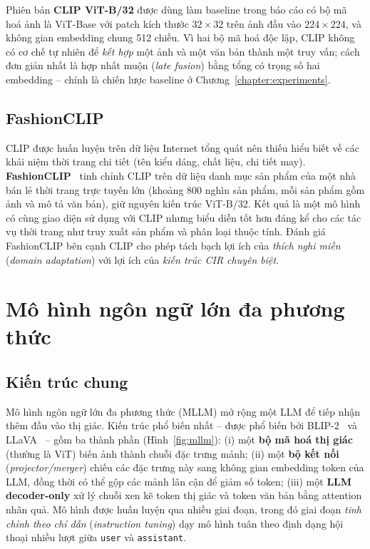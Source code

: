 Phiên bản \textbf{CLIP ViT-B/32} được dùng làm baseline trong báo cáo có bộ mã hoá ảnh là ViT-Base với patch kích thước $32 \times 32$ trên ảnh đầu vào $224 \times 224$, và không gian embedding chung 512 chiều. Vì hai bộ mã hoá độc lập, CLIP không có cơ chế tự nhiên để \emph{kết hợp} một ảnh và một văn bản thành một truy vấn; cách đơn giản nhất là hợp nhất muộn (\emph{late fusion}) bằng tổng có trọng số hai embedding -- chính là chiến lược baseline ở Chương~\ref{chapter:experiments}.

\subsection{FashionCLIP}

CLIP được huấn luyện trên dữ liệu Internet tổng quát nên thiếu hiểu biết về các khái niệm thời trang chi tiết (tên kiểu dáng, chất liệu, chi tiết may). \textbf{FashionCLIP}~\cite{chia2022fashionclip} tinh chỉnh CLIP trên dữ liệu danh mục sản phẩm của một nhà bán lẻ thời trang trực tuyến lớn (khoảng 800 nghìn sản phẩm, mỗi sản phẩm gồm ảnh và mô tả văn bản), giữ nguyên kiến trúc ViT-B/32. Kết quả là một mô hình có cùng giao diện sử dụng với CLIP nhưng biểu diễn tốt hơn đáng kể cho các tác vụ thời trang như truy xuất sản phẩm và phân loại thuộc tính. Đánh giá FashionCLIP bên cạnh CLIP cho phép tách bạch lợi ích của \emph{thích nghi miền} (\emph{domain adaptation}) với lợi ích của \emph{kiến trúc CIR chuyên biệt}.

\section{Mô hình ngôn ngữ lớn đa phương thức}\label{sec:mllm}

\subsection{Kiến trúc chung}

Mô hình ngôn ngữ lớn đa phương thức (MLLM) mở rộng một LLM để tiếp nhận thêm đầu vào thị giác. Kiến trúc phổ biến nhất -- được phổ biến bởi BLIP-2~\cite{li2023blip2} và LLaVA~\cite{liu2023llava} -- gồm ba thành phần (Hình~\ref{fig:mllm}): (i) một \textbf{bộ mã hoá thị giác} (thường là ViT) biến ảnh thành chuỗi đặc trưng mảnh; (ii) một \textbf{bộ kết nối} (\emph{projector/merger}) chiếu các đặc trưng này sang không gian embedding token của LLM, đồng thời có thể gộp các mảnh lân cận để giảm số token; (iii) một \textbf{LLM decoder-only} xử lý chuỗi xen kẽ token thị giác và token văn bản bằng attention nhân quả. Mô hình được huấn luyện qua nhiều giai đoạn, trong đó giai đoạn \emph{tinh chỉnh theo chỉ dẫn} (\emph{instruction tuning}) dạy mô hình tuân theo định dạng hội thoại nhiều lượt giữa \texttt{user} và \texttt{assistant}.

